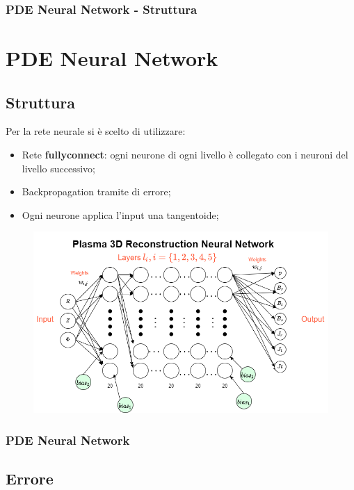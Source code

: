 \documentclass{beamer}
\begin{document}
\begin{frame}
	\frametitle{PDE Neural Network - Struttura} %
	\section{PDE Neural Network}
	\subsection{Struttura}
	Per la rete neurale si è scelto di utilizzare:
	\begin{itemize}
		\item Rete \textbf{fullyconnect}: ogni neurone di ogni livello è collegato con i neuroni del livello successivo;
		\item Backpropagation tramite di errore;
		\item Ogni neurone applica l'input una tangentoide;
	\end{itemize}
	\begin{figure}
		\includegraphics[scale=0.3]{reteOrganizzazione.png}
	\end{figure}

\end{frame}
\begin{frame}
	\frametitle{PDE Neural Network}
	\subsection{Errore}
	\vspace{-0.1cm}
		\begin{figure}
		\end{figure}
\end{frame}
\end{document}

